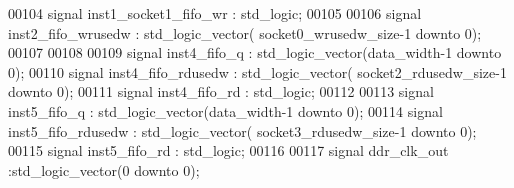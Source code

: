 \begin{DoxyCode}
00104 \textcolor{keywordflow}{signal} \textcolor{vhdlchar}{inst1_socket1_fifo_wr}                \textcolor{vhdlchar}{:} \textcolor{comment}{std\_logic};
00105 
00106 \textcolor{keywordflow}{signal} \textcolor{vhdlchar}{inst2_fifo_wrusedw}                   \textcolor{vhdlchar}{:} \textcolor{comment}{std\_logic\_vector}\textcolor{vhdlchar}{(}\textcolor{vhdlchar}{
      socket0_wrusedw_size}\textcolor{vhdlchar}{-}\textcolor{vhdllogic}{}\textcolor{vhdllogic}{1} \textcolor{keywordflow}{downto} \textcolor{vhdllogic}{}\textcolor{vhdllogic}{0}\textcolor{vhdlchar}{)};
00107 
00108 
00109 \textcolor{keywordflow}{signal} \textcolor{vhdlchar}{inst4_fifo_q}                         \textcolor{vhdlchar}{:} \textcolor{comment}{std\_logic\_vector}\textcolor{vhdlchar}{(}\textcolor{vhdlchar}{data_width}\textcolor{vhdlchar}{-}\textcolor{vhdllogic}{}\textcolor{vhdllogic}{1} \textcolor{keywordflow}{downto} \textcolor{vhdllogic}{}\textcolor{vhdllogic}{0}\textcolor{vhdlchar}{)};
00110 \textcolor{keywordflow}{signal} \textcolor{vhdlchar}{inst4_fifo_rdusedw}                   \textcolor{vhdlchar}{:} \textcolor{comment}{std\_logic\_vector}\textcolor{vhdlchar}{(}\textcolor{vhdlchar}{
      socket2_rdusedw_size}\textcolor{vhdlchar}{-}\textcolor{vhdllogic}{}\textcolor{vhdllogic}{1} \textcolor{keywordflow}{downto} \textcolor{vhdllogic}{}\textcolor{vhdllogic}{0}\textcolor{vhdlchar}{)};
00111 \textcolor{keywordflow}{signal} \textcolor{vhdlchar}{inst4_fifo_rd}                            \textcolor{vhdlchar}{:} \textcolor{comment}{std\_logic};
00112 
00113 \textcolor{keywordflow}{signal} \textcolor{vhdlchar}{inst5_fifo_q}                         \textcolor{vhdlchar}{:} \textcolor{comment}{std\_logic\_vector}\textcolor{vhdlchar}{(}\textcolor{vhdlchar}{data_width}\textcolor{vhdlchar}{-}\textcolor{vhdllogic}{}\textcolor{vhdllogic}{1} \textcolor{keywordflow}{downto} \textcolor{vhdllogic}{}\textcolor{vhdllogic}{0}\textcolor{vhdlchar}{)};
00114 \textcolor{keywordflow}{signal} \textcolor{vhdlchar}{inst5_fifo_rdusedw}                   \textcolor{vhdlchar}{:} \textcolor{comment}{std\_logic\_vector}\textcolor{vhdlchar}{(}\textcolor{vhdlchar}{
      socket3_rdusedw_size}\textcolor{vhdlchar}{-}\textcolor{vhdllogic}{}\textcolor{vhdllogic}{1} \textcolor{keywordflow}{downto} \textcolor{vhdllogic}{}\textcolor{vhdllogic}{0}\textcolor{vhdlchar}{)};
00115 \textcolor{keywordflow}{signal} \textcolor{vhdlchar}{inst5_fifo_rd}                            \textcolor{vhdlchar}{:} \textcolor{comment}{std\_logic};
00116 
00117 \textcolor{keywordflow}{signal} \textcolor{vhdlchar}{ddr_clk_out}                          \textcolor{vhdlchar}{:}\textcolor{comment}{std\_logic\_vector}\textcolor{vhdlchar}{(}\textcolor{vhdllogic}{}\textcolor{vhdllogic}{0} \textcolor{keywordflow}{downto} \textcolor{vhdllogic}{}\textcolor{vhdllogic}{0}\textcolor{vhdlchar}{)};

\end{DoxyCode}

